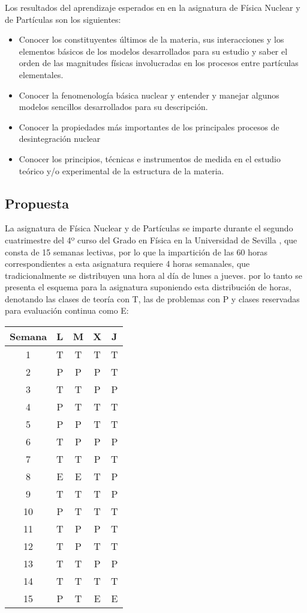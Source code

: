 \documentclass[a4paper,12pt,twoside]{article}
\begin{document}
Los resultados del aprendizaje esperados en en la asignatura de Física Nuclear y de Partículas son los siguientes:
\begin{itemize}
\item Conocer los constituyentes últimos de la materia, sus interacciones y los elementos básicos de los modelos
desarrollados para su estudio y saber el orden de las magnitudes físicas involucradas en los procesos entre partículas
elementales. 
\item Conocer la fenomenología básica nuclear y entender y manejar algunos modelos sencillos desarrollados para su
descripción.
\item  Conocer la propiedades más importantes de los principales procesos de desintegración nuclear
\item Conocer los principios, técnicas e instrumentos de medida en el estudio teórico y/o experimental de la estructura de la
materia. 
\end{itemize}

\subsection{Propuesta}

La asignatura de Física Nuclear y de Partículas se imparte durante el segundo cuatrimestre del 4º curso del Grado en Física en la Universidad de Sevilla \cite{horario}, que consta de 15 semanas lectivas, por lo que la impartición de las 60 horas correspondientes a esta asignatura requiere 4 horas semanales, que tradicionalmente se distribuyen una hora al día de lunes a jueves. por lo tanto se presenta el esquema para la asignatura suponiendo esta distribución de horas, denotando las clases de teoría con T, las de problemas con P y clases reservadas para evaluaci\'on continua como E:

\begin{table}[h]
\begin{center}
\begin{tabular}{|c|c|c|c|c|}
\hline
Semana & L & M & X & J \\
\hline\hline
1& T &T&T&T\\
\hline
2& P &P&P&T\\
\hline
3& T &T&P&P\\
\hline
4&P& T &T&T\\
\hline 5&P&P&T&T\\
\hline 6&T&P&P&P\\
\hline 7&T&T&P&T\\
\hline 8&E&E&T&P\\
\hline 9&T&T&T&P\\
\hline 10&P&T&T&T\\
\hline 11&T&P&P&T\\
\hline 12&T&P&T&T\\
\hline 13&T&T&P&P\\
\hline 14&T&T&T&T\\
\hline 15&P&T&E&E\\
\hline \end{tabular}
\end{center}
\end{table}
\end{document}

